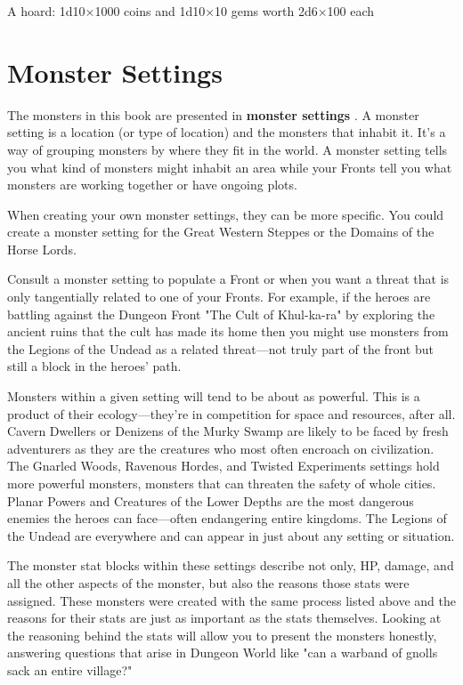          
\item A hoard: 1d10×1000 coins and 1d10×10 gems worth 2d6×100 each

       
\stopitemize
       
\section{Monster Settings}    
       

The monsters in this book are presented in {\bf monster settings} . A monster setting is a location (or type of location) and the monsters that inhabit it. It's a way of grouping monsters by where they fit in the world. A monster setting tells you what kind of monsters might inhabit an area while your Fronts tell you what monsters are working together or have ongoing plots.

       

When creating your own monster settings, they can be more specific. You could create a monster setting for the Great Western Steppes or the Domains of the Horse Lords.

       

Consult a monster setting to populate a Front or when you want a threat that is only tangentially related to one of your Fronts. For example, if the heroes are battling against the Dungeon Front "The Cult of Khul-ka-ra" by exploring the ancient ruins that the cult has made its home then you might use monsters from the Legions of the Undead as a related threat—not truly part of the front but still a block in the heroes' path.

       

Monsters within a given setting will tend to be about as powerful. This is a product of their ecology—they're in competition for space and resources, after all. Cavern Dwellers or Denizens of the Murky Swamp are likely to be faced by fresh adventurers as they are the creatures who most often encroach on civilization. The Gnarled Woods, Ravenous Hordes, and Twisted Experiments settings hold more powerful monsters, monsters that can threaten the safety of whole cities. Planar Powers and Creatures of the Lower Depths are the most dangerous enemies the heroes can face—often endangering entire kingdoms. The Legions of the Undead are everywhere and can appear in just about any setting or situation.

       

The monster stat blocks within these settings describe not only, HP, damage, and all the other aspects of the monster, but also the reasons those stats were assigned. These monsters were created with the same process listed above and the reasons for their stats are just as important as the stats themselves. Looking at the reasoning behind the stats will allow you to present the monsters honestly, answering questions that arise in Dungeon World like "can a warband of gnolls sack an entire village?"

